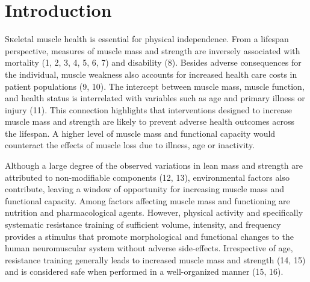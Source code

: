 \documentclass[twoside,10pt]{gihclass} %
\begin{document}
  \hypersetup{linkcolor=black}
  \setcounter{tocdepth}{2}
  \tableofcontents

  \listoftables

  \listoffigures




\mainmatter %
\pagestyle{fancyplain} %

\setcounter{DefaultLines}{3}

\hypertarget{introduction}{%
\chapter{Introduction}\label{introduction}}

\lettrine{S}keletal muscle health is essential for physical independence. From a lifespan perspective, measures of muscle mass and strength are inversely associated with mortality
(1, 2, 3, 4, 5, 6, 7)
and disability
(8).
Besides adverse consequences for the individual, muscle weakness also accounts for increased health care costs in patient populations
(9, 10).
The intercept between muscle mass, muscle function, and health status is interrelated with variables such as age and primary illness or injury
(11).
This connection highlights that interventions designed to increase muscle mass and strength are likely to prevent adverse health outcomes across the lifespan. A higher level of muscle mass and functional capacity would counteract the effects of muscle loss due to illness, age or inactivity.

Although a large degree of the observed variations in lean mass and strength are attributed to non-modifiable components
(12, 13),
environmental factors also contribute, leaving a window of opportunity for increasing muscle mass and functional capacity. Among factors affecting muscle mass and functioning are nutrition and pharmacological agents. However, physical activity and specifically systematic resistance training of sufficient volume, intensity, and frequency provides a stimulus that promote morphological and functional changes to the human neuromuscular system without adverse side-effects. Irrespective of age, resistance training generally leads to increased muscle mass and strength
(14, 15)
and is considered safe when performed in a well-organized manner
(15, 16).
\end{document}
